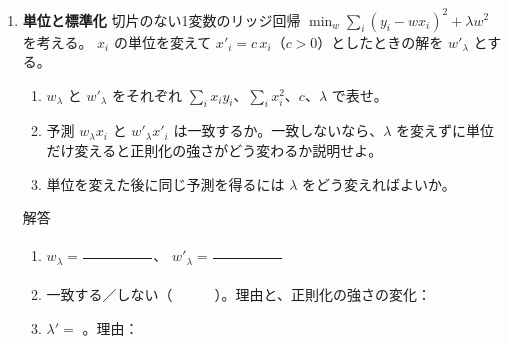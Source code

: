 \documentclass[a4paper,dvipdfmx]{jsarticle}
\newcommand{\提出期限}{2026年11月2日（月）}
\newcommand{\学籍番号}{0000000}
\newcommand{\氏名}{氏名を書く}
\newcommand{\提出日}{2026年11月2日}
\newenvironment{answer}{\begin{itembox}[l]{解答}}{\end{itembox}}
\begin{document}
\begin{enumerate}
  \item \textbf{単位と標準化}\quad
    切片のない1変数のリッジ回帰 $\min_w \sum_i (y_i - w x_i)^2 + \lambda w^2$ を考える。
    $x_i$ の単位を変えて $x'_i = c\,x_i$（$c > 0$）としたときの解を $w'_\lambda$ とする。
    \begin{enumerate}
      \item $w_\lambda$ と $w'_\lambda$ をそれぞれ $\sum_i x_i y_i$、$\sum_i x_i^2$、$c$、$\lambda$ で表せ。
      \item 予測 $w_\lambda x_i$ と $w'_\lambda x'_i$ は一致するか。一致しないなら、$\lambda$ を変えずに単位だけ変えると正則化の強さがどう変わるか説明せよ。
      \item 単位を変えた後に同じ予測を得るには $\lambda$ をどう変えればよいか。
    \end{enumerate}
    \begin{answer}
      \begin{enumerate}
        \item $w_\lambda = \dfrac{\phantom{XXXXXX}}{\phantom{XXXXXX}}$、\quad
          $w'_\lambda = \dfrac{\phantom{XXXXXX}}{\phantom{XXXXXX}}$
          \vspace{6mm}
        \item 一致する／しない（　　　）。理由と、正則化の強さの変化：
          \vspace{14mm}
        \item $\lambda' = $ \phantom{XXXXXX}。理由：
          \vspace{8mm}
      \end{enumerate}
    \end{answer}


\end{enumerate}
\end{document}
